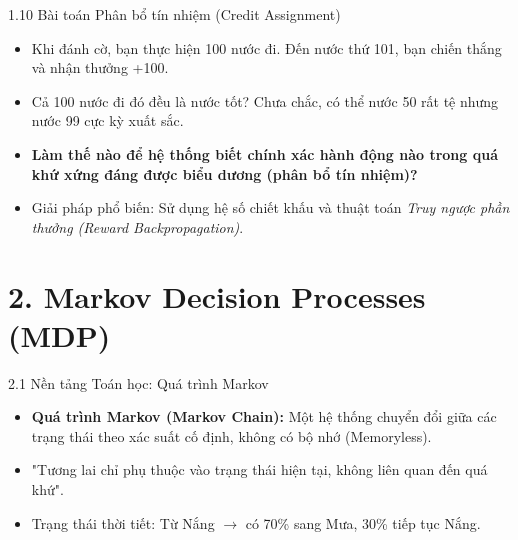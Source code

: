 \documentclass[aspectratio=169, 12pt]{beamer}
\begin{document}
\begin{frame}{1.10 Bài toán Phân bổ tín nhiệm (Credit Assignment)}
    \begin{itemize}
        \item Khi đánh cờ, bạn thực hiện 100 nước đi. Đến nước thứ 101, bạn chiến thắng và nhận thưởng +100.
        \item Cả 100 nước đi đó đều là nước tốt? Chưa chắc, có thể nước 50 rất tệ nhưng nước 99 cực kỳ xuất sắc.
        \item \textbf{Làm thế nào để hệ thống biết chính xác hành động nào trong quá khứ xứng đáng được biểu dương (phân bổ tín nhiệm)?}
        \item Giải pháp phổ biến: Sử dụng hệ số chiết khấu và thuật toán \textit{Truy ngược phần thưởng (Reward Backpropagation)}.
    \end{itemize}
\end{frame}


\section{2. Markov Decision Processes (MDP)}

\begin{frame}{2.1 Nền tảng Toán học: Quá trình Markov}
    \begin{itemize}
        \item \textbf{Quá trình Markov (Markov Chain):} Một hệ thống chuyển đổi giữa các trạng thái theo xác suất cố định, không có bộ nhớ (Memoryless).
        \item "Tương lai chỉ phụ thuộc vào trạng thái hiện tại, không liên quan đến quá khứ".
        \item Trạng thái thời tiết: Từ Nắng $\rightarrow$ có 70\% sang Mưa, 30\% tiếp tục Nắng.
    \end{itemize}
\end{frame}
\end{document}

